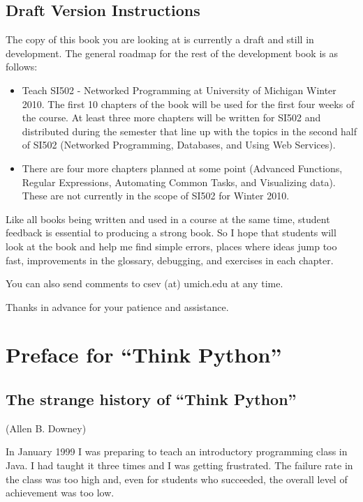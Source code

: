 \documentclass[10pt]{book}
\begin{document}
\subsection*{Draft Version Instructions}

The copy of this book you are looking at is currently a draft and still in
development.  The general roadmap for the rest of the development book 
is as follows:

\begin{itemize}

\item Teach SI502 - Networked Programming at University of Michigan
Winter 2010.  The first 10 chapters of the book will be 
used for the first four weeks of the course.  At least three more 
chapters will be written for SI502 and distributed during the semester
that line up with the topics in the second half of SI502 
(Networked Programming, Databases, and Using Web Services).

\item There are four more chapters planned at some point 
(Advanced Functions, Regular Expressions, Automating Common Tasks,
and Visualizing data).  These are not currently in the scope of SI502
for Winter 2010.

\end{itemize}

Like all books being written and used in a course at the same time, 
student feedback is essential to producing a strong book.  So I 
hope that students will look at the book and help me find simple 
errors, places where ideas jump too fast, improvements in the glossary, 
debugging, and exercises in each chapter.  

You can also send comments to csev (at) umich.edu at any time.

Thanks in advance for your patience and assistance.

\section*{Preface for ``Think Python''}

\subsection*{The strange history of ``Think Python''}

(Allen B. Downey)

In January 1999 I was preparing to teach an introductory programming
class in Java.  I had taught it three times and I was getting
frustrated.  The failure rate in the class was too high and, even for
students who succeeded, the overall level of achievement was too low.
\end{document}

